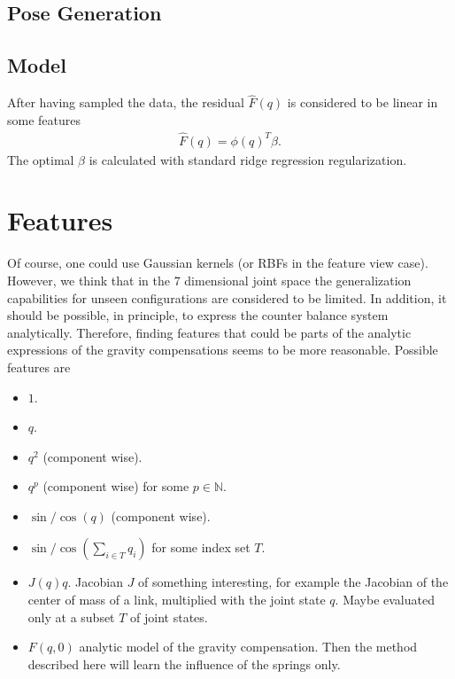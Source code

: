 \documentclass[10pt,fleqn,twoside]{article}
\begin{document}
\subsection{Pose Generation}
\subsection{Model}
After having sampled the data, the residual $\widehat{F}(q)$ is considered to be linear in some features
\begin{align}
	\widehat{F}(q) = \phi(q)^T\beta.
\end{align}
The optimal $\beta$ is calculated with standard ridge regression regularization. 
\section{Features}
Of course, one could use Gaussian kernels (or RBFs in the feature view case). However, we think that in the 7 dimensional joint space the generalization capabilities for unseen configurations are considered to be limited. In addition, it should be possible, in principle, to express the counter balance system analytically. Therefore, finding features that could be parts of the analytic expressions of the gravity compensations seems to be more reasonable. Possible features are
\begin{itemize}
\item $1$.
\item $q$.
\item $q^2$ (component wise).
\item $q^p$ (component wise) for some $p\in\mathbb{N}$.
\item $\sin/\cos(q)$ (component wise).
\item $\sin/\cos\left(\sum_{i\in T}q_i\right)$ for some index set $T$.
\item $J(q)q$. Jacobian $J$ of something interesting, for example the Jacobian of the center of mass of a link, multiplied with the joint state $q$. Maybe evaluated only at a subset $T$ of joint states.
\item $F(q,0)$ analytic model of the gravity compensation. Then the method described here will learn the influence of the springs only. 
\end{itemize}
\end{document}
